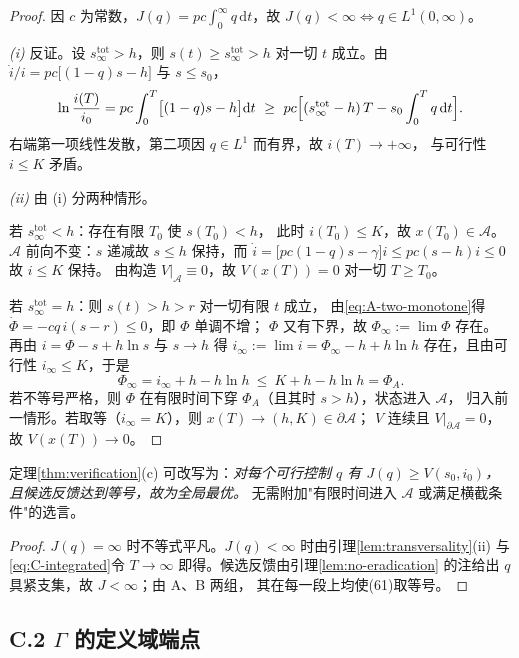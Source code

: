 \begin{proof}
因 $c$ 为常数，$J(q)=pc\int_0^\infty q\,\mathrm{d}t$，故
$J(q)<\infty\iff q\in L^1(0,\infty)$。

\emph{(i)} 反证。设 $s_\infty^{\mathrm{tot}}>h$，则 $s(t)\ge s_\infty^{\mathrm{tot}}>h$
对一切 $t$ 成立。由 $\dot i/i=pc\bigl[(1-q)s-h\bigr]$ 与 $s\le s_0$，
\[
  \ln\frac{i(T)}{i_0}
  =pc\int_0^{T}\bigl[(1-q)s-h\bigr]\mathrm{d}t
  \ \ge\ pc\Bigl[(s_\infty^{\mathrm{tot}}-h)\,T-s_0\int_0^{T}q\,\mathrm{d}t\Bigr].
\]
右端第一项线性发散，第二项因 $q\in L^1$ 而有界，故 $i(T)\to+\infty$，
与可行性 $i\le K$ 矛盾。

\emph{(ii)} 由 (i) 分两种情形。

若 $s_\infty^{\mathrm{tot}}<h$：存在有限 $T_0$ 使 $s(T_0)<h$，
此时 $i(T_0)\le K$，故 $x(T_0)\in\mathcal{A}$。
$\mathcal{A}$ 前向不变：$s$ 递减故 $s\le h$ 保持，而
$\dot i=\bigl[pc(1-q)s-\gamma\bigr]i\le pc(s-h)i\le0$ 故 $i\le K$ 保持。
由构造 $V|_{\mathcal{A}}\equiv0$，故 $V(x(T))=0$ 对一切 $T\ge T_0$。

若 $s_\infty^{\mathrm{tot}}=h$：则 $s(t)>h>r$ 对一切有限 $t$ 成立，
由\eqref{eq:A-two-monotone}得 $\dot\Phi=-cq\,i(s-r)\le0$，即 $\Phi$ 单调不增；
$\Phi$ 又有下界，故 $\Phi_\infty:=\lim\Phi$ 存在。
再由 $i=\Phi-s+h\ln s$ 与 $s\to h$ 得
$i_\infty:=\lim i=\Phi_\infty-h+h\ln h$ 存在，且由可行性 $i_\infty\le K$，于是
\[
  \Phi_\infty=i_\infty+h-h\ln h\ \le\ K+h-h\ln h=\Phi_A .
\]
若不等号严格，则 $\Phi$ 在有限时间下穿 $\Phi_A$（且其时 $s>h$），状态进入 $\mathcal{A}$，
归入前一情形。若取等（$i_\infty=K$），则 $x(T)\to(h,K)\in\partial\mathcal{A}$；
$V$ 连续且 $V|_{\partial\mathcal{A}}=0$，故 $V(x(T))\to0$。
\end{proof}

\begin{corollary}
\label{cor:verification-clean}
定理\ref{thm:verification}(c) 可改写为：\emph{对每个可行控制 $q$ 有
$J(q)\ge V(s_0,i_0)$，且候选反馈达到等号，故为全局最优。}
无需附加"有限时间进入 $\mathcal{A}$ 或满足横截条件"的选言。
\end{corollary}

\begin{proof}
$J(q)=\infty$ 时不等式平凡。$J(q)<\infty$ 时由引理\ref{lem:transversality}(ii)
与\eqref{eq:C-integrated}令 $T\to\infty$ 即得。候选反馈由引理\ref{lem:no-eradication}
的注给出 $q$ 具紧支集，故 $J<\infty$；由 A、B 两组，
其在每一段上均使(61)取等号。
\end{proof}


\subsection*{C.2 $\Gamma$ 的定义域端点}


